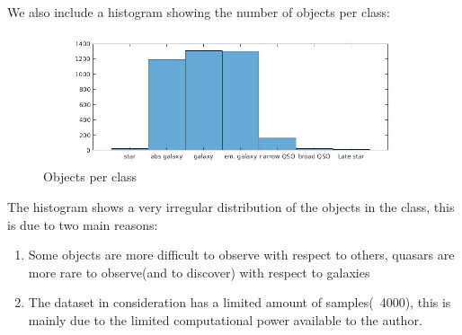 \documentclass[a4paper,10pt]{article}
\begin{document}
    We also include a histogram showing the number of objects per class:
    \begin{figure}[H]
      \caption{Objects per class}
      \centering
      \includegraphics[scale=0.4]{histogram.jpg}
    \end{figure}
    The histogram shows a very irregular distribution of the objects in the class, this is due to two main reasons:
    \begin{enumerate}
     \item Some objects are more difficult to observe with respect to others, quasars are more rare to observe(and to discover) with respect to galaxies
     \item The dataset in consideration has a limited amount of samples(~4000), this is mainly due to the limited computational power available to the author. 
    \end{enumerate}

  
\end{document}
